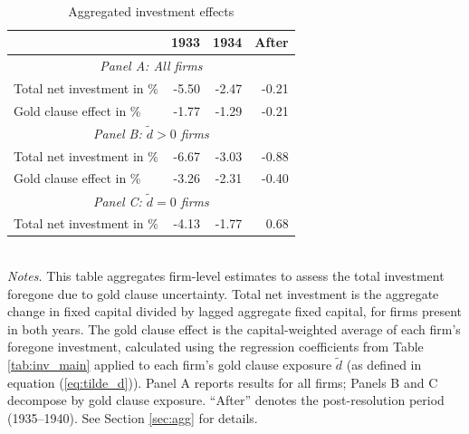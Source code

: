 \begin{table}[p]\centering
    \caption{\\Aggregated investment effects}\footnotesize
    \label{tab:agg}
    \begin{tabular}{lrrr}
    \toprule
    & 1933 & 1934 & After \\
    \midrule
    \multicolumn{4}{c}{\textit{Panel A: All firms}}\\
    \midrule
    Total net investment in \%               & -5.50 & -2.47 & -0.21 \\
    Gold clause effect in \%               & -1.77 & -1.29 & -0.21 \\
    \midrule
    \multicolumn{4}{c}{\textit{Panel B: $\tilde{d}>0$ firms}}\\
    \midrule
    Total net investment in \%               & -6.67 & -3.03 & -0.88 \\
    Gold clause effect in \%               & -3.26 & -2.31 & -0.40 \\
    \midrule
    \multicolumn{4}{c}{\textit{Panel C: $\tilde{d}=0$ firms}}\\
    \midrule
    Total net investment in \%               & -4.13 & -1.77 & 0.68 \\
    \bottomrule

    \end{tabular}\\

    \vspace*{3mm} \justifying \noindent
\footnotesize{\textit{Notes.} This table aggregates firm-level estimates to assess the total investment foregone due to gold clause uncertainty. Total net investment is the aggregate change in fixed capital divided by lagged aggregate fixed capital, for firms present in both years. The gold clause effect is the capital-weighted average of each firm's foregone investment, calculated using the regression coefficients from Table \ref{tab:inv_main} applied to each firm's gold clause exposure $\tilde{d}$ (as defined in equation (\ref{eq:tilde_d})). Panel A reports results for all firms; Panels B and C decompose by gold clause exposure. ``After'' denotes the post-resolution period (1935--1940). See Section \ref{sec:agg} for details.}
\end{table}